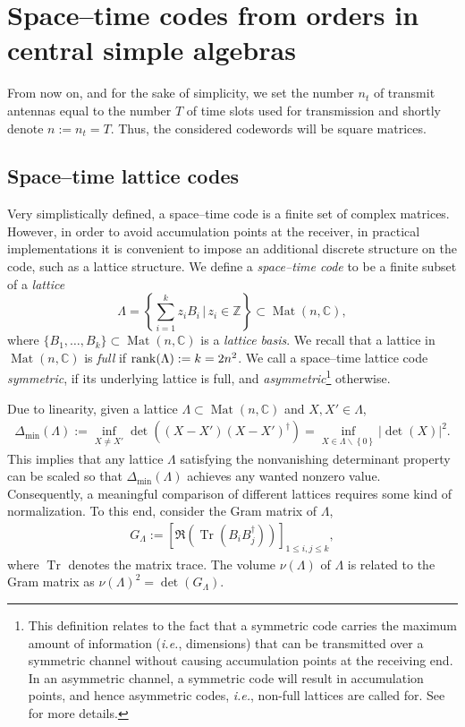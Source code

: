 \documentclass[smallextended]{svjour3}
\newcommand{\Z}{\mathbb{Z}}
\newcommand{\C}{\mathbb{C}}
\newcommand{\rank}{{\rm rank}}
\DeclareMathOperator{\Mat}{Mat}
\DeclareMathOperator{\Tr}{Tr}
\begin{document}
\section{Space--time codes from orders in central simple algebras}
\label{sec:stc}
From now on, and for the sake of simplicity, we set the number $n_t$ of transmit antennas equal to the number $T$ of time slots used for transmission and shortly denote $n:=n_t=T$. Thus, the considered codewords  will be square matrices.

\subsection{Space--time lattice codes}
\label{sec:sec2}

Very simplistically defined, a space--time code is a finite set of complex matrices. However, in order to avoid accumulation points at the receiver, in practical implementations it is convenient to impose an additional discrete structure on the code, such as a lattice structure. We define a \emph{space--time code} to be a finite subset of a \emph{lattice} 
$$
\Lambda =\left\{\sum_{i=1}^k z_i B_i\,|\, z_i\in\Z\right\}\subset \Mat(n,\C),
$$ 
where $\{B_1,\ldots,B_k\}\subset \Mat(n,\C)$ is a \emph{lattice basis}. We recall that a lattice in $\Mat(n,\C)$ is \emph{full} if $\rank(\Lambda) := k= 2 n^2$. We call a space--time lattice code \emph{symmetric}, if its underlying lattice is full, and \emph{asymmetric}\footnote{This definition relates to the fact that a symmetric code carries the maximum amount of information (\emph{i.e.}, dimensions) that can be transmitted over a symmetric channel without causing accumulation points at the receiving end. In an asymmetric channel, a symmetric code will result in accumulation points, and hence asymmetric codes, \emph{i.e.}, non-full lattices are called for. See \cite{HL} for more details.} otherwise. 

Due to linearity, given a lattice $\Lambda \subset \Mat(n,\C)$ and $X, X' \in \Lambda$,
\begin{align*}
	\Delta_{\min}(\Lambda) := \inf\limits_{X \neq X'} \det \left((X-X')(X-X')^{\dagger} \right) =
 \inf\limits_{X \in \Lambda\backslash\left\{0\right\}}{\left|\det(X)\right|^2}.
\end{align*}
This implies that any lattice $\Lambda$ satisfying the nonvanishing determinant property can be scaled so that $\Delta_{\min}(\Lambda) $ achieves any wanted nonzero value. 
Consequently, a meaningful comparison of different lattices requires some kind of normalization. To this end, 
consider the Gram matrix of $\Lambda$,
\begin{align*}
	G_{\Lambda} := \left[\Re\left(\Tr\left(B_i B_j^\dagger\right)\right)\right]_{1 \le i,j \le k},
\end{align*}
where $\Tr$ denotes the matrix trace. The volume $\nu(\Lambda)$ of $\Lambda$ is related to the Gram matrix as $\nu(\Lambda)^2 = \det(G_{\Lambda})$. 
\end{document}
